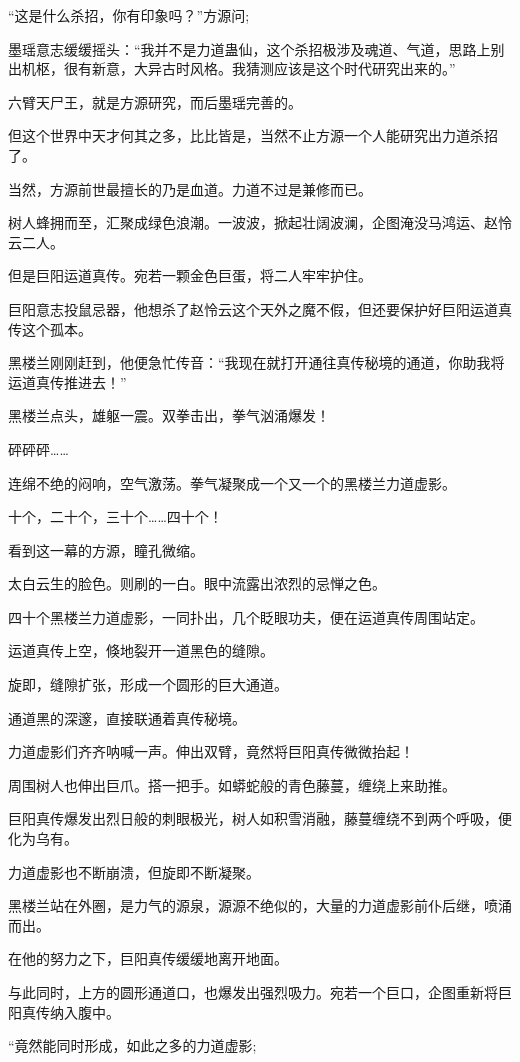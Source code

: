 \begin{this_body}
“这是什么杀招，你有印象吗？”方源问;

墨瑶意志缓缓摇头：“我并不是力道蛊仙，这个杀招极涉及魂道、气道，思路上别出机枢，很有新意，大异古时风格。我猜测应该是这个时代研究出来的。”

六臂天尸王，就是方源研究，而后墨瑶完善的。

但这个世界中天才何其之多，比比皆是，当然不止方源一个人能研究出力道杀招了。

当然，方源前世最擅长的乃是血道。力道不过是兼修而已。

树人蜂拥而至，汇聚成绿色浪潮。一波波，掀起壮阔波澜，企图淹没马鸿运、赵怜云二人。

但是巨阳运道真传。宛若一颗金色巨蛋，将二人牢牢护住。

巨阳意志投鼠忌器，他想杀了赵怜云这个天外之魔不假，但还要保护好巨阳运道真传这个孤本。

黑楼兰刚刚赶到，他便急忙传音：“我现在就打开通往真传秘境的通道，你助我将运道真传推进去！”

黑楼兰点头，雄躯一震。双拳击出，拳气汹涌爆发！

砰砰砰……

连绵不绝的闷响，空气激荡。拳气凝聚成一个又一个的黑楼兰力道虚影。

十个，二十个，三十个……四十个！

看到这一幕的方源，瞳孔微缩。

太白云生的脸色。则刷的一白。眼中流露出浓烈的忌惮之色。

四十个黑楼兰力道虚影，一同扑出，几个眨眼功夫，便在运道真传周围站定。

运道真传上空，倏地裂开一道黑色的缝隙。

旋即，缝隙扩张，形成一个圆形的巨大通道。

通道黑的深邃，直接联通着真传秘境。

力道虚影们齐齐呐喊一声。伸出双臂，竟然将巨阳真传微微抬起！

周围树人也伸出巨爪。搭一把手。如蟒蛇般的青色藤蔓，缠绕上来助推。

巨阳真传爆发出烈日般的刺眼极光，树人如积雪消融，藤蔓缠绕不到两个呼吸，便化为乌有。

力道虚影也不断崩溃，但旋即不断凝聚。

黑楼兰站在外圈，是力气的源泉，源源不绝似的，大量的力道虚影前仆后继，喷涌而出。

在他的努力之下，巨阳真传缓缓地离开地面。

与此同时，上方的圆形通道口，也爆发出强烈吸力。宛若一个巨口，企图重新将巨阳真传纳入腹中。

“竟然能同时形成，如此之多的力道虚影;


\end{this_body}
